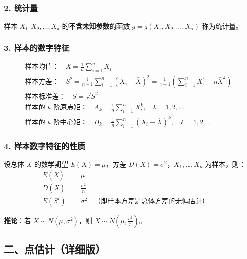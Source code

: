 \documentclass[12pt,a4paper]{ctexart}
\begin{document}
\subsubsection{2. 统计量}
样本 $X_1, X_2, \dots, X_n$ 的\textbf{不含未知参数}的函数 $g = g(X_1, X_2, \dots, X_n)$ 称为统计量。

\subsubsection{3. 样本的数字特征}
\begin{align*}
     & \text{样本均值：}\quad \bar{X} = \frac{1}{n} \sum_{i=1}^n X_i                                                                            \\
     & \text{样本方差：}\quad S^2 = \frac{1}{n-1} \sum_{i=1}^n (X_i - \bar{X})^2 = \frac{1}{n-1} \left( \sum_{i=1}^n X_i^2 - n\bar{X}^2 \right) \\
     & \text{样本标准差：}\quad S = \sqrt{S^2}                                                                                                   \\
     & \text{样本的 }k\text{ 阶原点矩：}\quad A_k = \frac{1}{n} \sum_{i=1}^n X_i^k,\quad k = 1, 2, \dots                                           \\
     & \text{样本的 }k\text{ 阶中心矩：}\quad B_k = \frac{1}{n} \sum_{i=1}^n (X_i - \bar{X})^k,\quad k = 1, 2, \dots
\end{align*}

\subsubsection{4. 样本数字特征的性质}
设总体 $X$ 的数学期望 $E(X) = \mu$，方差 $D(X) = \sigma^2$，$X_1, \dots, X_n$ 为样本，则：
\begin{align*}
    E(\bar{X}) & = \mu                                    \\
    D(\bar{X}) & = \frac{\sigma^2}{n}                     \\
    E(S^2)     & = \sigma^2 \quad\text{（即样本方差是总体方差的无偏估计）}
\end{align*}

\textbf{推论}：若 $X \sim N(\mu, \sigma^2)$，则 $\bar{X} \sim N(\mu, \frac{\sigma^2}{n})$。

\subsection{二、点估计（详细版）}
\end{document}
